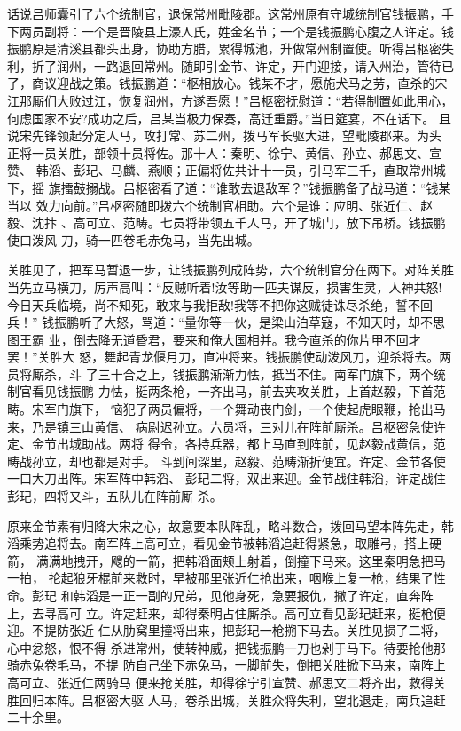 话说吕师囊引了六个统制官，退保常州毗陵郡。这常州原有守城统制官钱振鹏，手
下两员副将：一个是晋陵县上濠人氏，姓金名节；一个是钱振鹏心腹之人许定。钱
振鹏原是清溪县都头出身，协助方腊，累得城池，升做常州制置使。听得吕枢密失
利，折了润州，一路退回常州。随即引金节、许定，开门迎接，请入州治，管待已
了，商议迎战之策。钱振鹏道：“枢相放心。钱某不才，愿施犬马之劳，直杀的宋
江那厮们大败过江，恢复润州，方遂吾愿！”吕枢密抚慰道：“若得制置如此用心，
何虑国家不安?成功之后，吕某当极力保奏，高迁重爵。”当日筵宴，不在话下。
且说宋先锋领起分定人马，攻打常、苏二州，拨马军长驱大进，望毗陵郡来。为头
正将一员关胜，部领十员将佐。那十人：秦明、徐宁、黄信、孙立、郝思文、宣赞、
韩滔、彭玘、马麟、燕顺；正偏将佐共计十一员，引马军三千，直取常州城下，摇
旗擂鼓搦战。吕枢密看了道：“谁敢去退敌军？”钱振鹏备了战马道：“钱某当以
效力向前。”吕枢密随即拨六个统制官相助。六个是谁：应明、张近仁、赵毅、沈抃
、高可立、范畴。七员将带领五千人马，开了城门，放下吊桥。钱振鹏使口泼风
刀，骑一匹卷毛赤兔马，当先出城。

关胜见了，把军马暂退一步，让钱振鹏列成阵势，六个统制官分在两下。对阵关胜
当先立马横刀，厉声高叫：“反贼听着!汝等助一匹夫谋反，损害生灵，人神共怒!
今日天兵临境，尚不知死，敢来与我拒敌!我等不把你这贼徒诛尽杀绝，誓不回兵！”
钱振鹏听了大怒，骂道：“量你等一伙，是梁山泊草寇，不知天时，却不思图王霸
业，倒去降无道昏君，要来和俺大国相并。我今直杀的你片甲不回才罢！”关胜大
怒，舞起青龙偃月刀，直冲将来。钱振鹏使动泼风刀，迎杀将去。两员将厮杀，斗
了三十合之上，钱振鹏渐渐力怯，抵当不住。南军门旗下，两个统制官看见钱振鹏
力怯，挺两条枪，一齐出马，前去夹攻关胜，上首赵毅，下首范畴。宋军门旗下，
恼犯了两员偏将，一个舞动丧门剑，一个使起虎眼鞭，抢出马来，乃是镇三山黄信、
病尉迟孙立。六员将，三对儿在阵前厮杀。吕枢密急使许定、金节出城助战。两将
得令，各持兵器，都上马直到阵前，见赵毅战黄信，范畴战孙立，却也都是对手。
斗到间深里，赵毅、范畴渐折便宜。许定、金节各使一口大刀出阵。宋军阵中韩滔、
彭玘二将，双出来迎。金节战住韩滔，许定战住彭玘，四将又斗，五队儿在阵前厮
杀。

原来金节素有归降大宋之心，故意要本队阵乱，略斗数合，拨回马望本阵先走，韩
滔乘势追将去。南军阵上高可立，看见金节被韩滔追赶得紧急，取雕弓，搭上硬箭，
满满地拽开，飕的一箭，把韩滔面颊上射着，倒撞下马来。这里秦明急把马一拍，
抡起狼牙棍前来救时，早被那里张近仁抢出来，咽喉上复一枪，结果了性命。彭玘
和韩滔是一正一副的兄弟，见他身死，急要报仇，撇了许定，直奔阵上，去寻高可
立。许定赶来，却得秦明占住厮杀。高可立看见彭玘赶来，挺枪便迎。不提防张近
仁从肋窝里撞将出来，把彭玘一枪搠下马去。关胜见损了二将，心中忿怒，恨不得
杀进常州，使转神威，把钱振鹏一刀也剁于马下。待要抢他那骑赤兔卷毛马，不提
防自己坐下赤兔马，一脚前失，倒把关胜掀下马来，南阵上高可立、张近仁两骑马
便来抢关胜，却得徐宁引宣赞、郝思文二将齐出，救得关胜回归本阵。吕枢密大驱
人马，卷杀出城，关胜众将失利，望北退走，南兵追赶二十余里。

